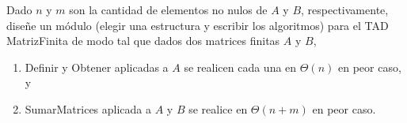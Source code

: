 Dado $n$ y $m$ son la cantidad de elementos no nulos de $A$ y $B$, respectivamente, diseñe un módulo (elegir una estructura y escribir los algoritmos) para el TAD MatrizFinita de modo tal que dados dos matrices finitas $A$ y $B$,
\begin{enumerate}[label=(\alph*)]
	\item Definir y Obtener aplicadas a $A$ se realicen cada una en $\Theta(n)$ en peor caso, y
	\item SumarMatrices aplicada a $A$ y $B$ se realice en $\Theta(n + m)$ en peor caso.
\end{enumerate}

\hacer


